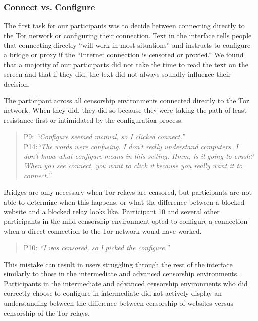 \documentclass[USenglish,oneside,twocolumn]{article}
\begin{document}
\subsubsection{Connect vs. Configure} 
The first task for our participants was to decide between connecting directly to the Tor network or configuring their connection. Text in the interface tells people that connecting directly ``will work in most situations'' and instructs to configure a bridge or proxy if the ``Internet connection is censored or proxied.'' We found that a majority of our participants did not take the time to read the text on the screen and that if they did, the text did not always soundly influence their decision.

The participant across all censorship environments connected directly to the Tor network. When they did, they did so because they were taking the path of least resistance first or intimidated by the configuration process. 
\begin{quotation}
\noindent P9: \textit{``Configure seemed manual, so I clicked connect.''}\\

\noindent P14:\textit{``The words were confusing. I don't really understand computers. I don't know what configure means in this setting. Hmm, is it going to crash? When you see connect, you want to click it because you really want it to connect.''} 
\end{quotation}

Bridges are only necessary when Tor relays are censored, but participants are not able to determine when this happens, or what the difference between a blocked website and a blocked relay looks like. Participant 10 and several other participants in the mild censorship environment opted to configure a connection when a direct connection to the Tor network would have worked. 

\begin{quotation}
\noindent P10: \textit{``I was censored, so I picked the configure.''}
\end{quotation}

This mistake can result in users struggling through the rest of the interface similarly to those in the intermediate and advanced censorship environments.
Participants in the intermediate and advanced censorship environments who did correctly choose to configure in intermediate did not actively display an understanding between the difference between censorship of websites versus censorship of the Tor relays.
\end{document}
